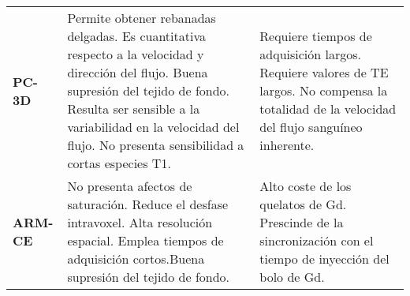 \begin{table}[p]
\begin{tabular}{l p{6cm} p{6cm}}
\textbf{PC-3D}   & Permite obtener rebanadas delgadas. Es cuantitativa respecto a la velocidad y dirección del flujo. Buena supresión del tejido de fondo. Resulta ser sensible a la variabilidad en la velocidad del flujo. No presenta sensibilidad a cortas especies T1.        & Requiere tiempos de adquisición largos. Requiere valores de TE largos. No compensa la totalidad de la velocidad del flujo sanguíneo inherente.                                                                                                          \\
\textbf{ARM-CE}  & No presenta afectos de saturación. Reduce el desfase intravoxel. Alta resolución espacial. Emplea tiempos de adquisición cortos.Buena supresión del tejido de fondo.                                                                                           & Alto coste de los quelatos de Gd. Prescinde de la sincronización con el tiempo de inyección del bolo de Gd.                                                                                                                                           \\ \bottomrule
\end{tabular}
\end{table}